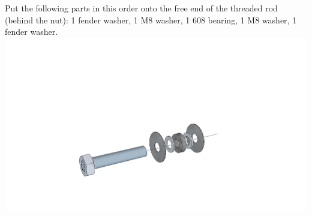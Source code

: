 \documentclass[twoside,openany,a4paper,titlepage]{memoir}
\begin{document}
	\section{}
	Put the following parts in this order onto the free end of the threaded rod (behind the nut): 1 fender
	washer, 1 M8 washer, 1 608 bearing, 1 M8 washer, 1 fender washer.\\
	\includegraphics[width=1\linewidth]{graphics/ch7_10.png}
	
\end{document}
